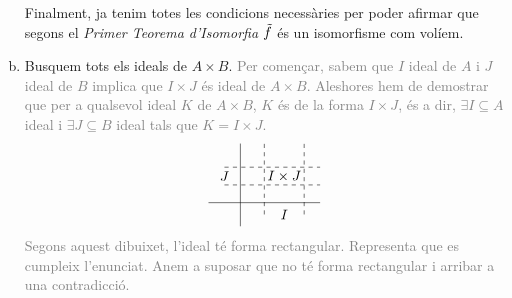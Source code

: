 \documentclass[../main.tex]{subfiles}
\begin{document}
\begin{enumerate}[(a)]
    Finalment, ja tenim totes les condicions necessàries per poder afirmar que segons el \textit{Primer Teorema d'Isomorfia} $\Tilde{f}$ és un isomorfisme com volíem.
    
    \item Busquem tots els ideals de $A\times B$. \textcolor{gray}{Per començar, sabem que $I$ ideal de $A$ i $J$ ideal de $B$ implica que $I\times J$ és ideal de $A\times B$. Aleshores hem de demostrar que per a qualsevol ideal $K$ de $A\times B$, $K$ és de la forma $I\times J$, és a dir, $\exists I\subseteq A$ ideal i $\exists J\subseteq B$ ideal tals que $K=I\times J$.
    \begin{equation}
        \notag
        \begin{tikzpicture}[x=.20cm,y=.15cm]
            \draw (-4,0) -- (10,0);
            \draw (0,-4) -- (0,10);
            \draw[dashed] (3,-2) -- (3,10);
            \draw[dashed] (8,-2) -- (8,10);
            \draw[dashed] (-2,3) -- (10,3);
            \draw[dashed] (-2,6) -- (10,6);
            \node at (5.5,4.5) {$I\times J$};
            \node at (5.5,-2) {$I$};
            \node at (-2,4.5) {$J$};
        \end{tikzpicture}
    \end{equation}
    Segons aquest dibuixet, l'ideal té forma rectangular. Representa que es cumpleix l'enunciat. Anem a suposar que no té forma rectangular i arribar a una contradicció.
    }
    

\end{enumerate}
\end{document}
